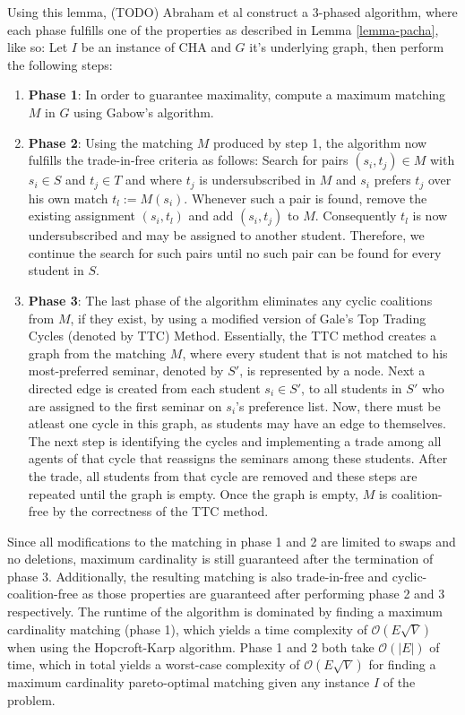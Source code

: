 Using this lemma, (TODO) Abraham et al \cite{Abraham:Pacha} construct a 3-phased algorithm, where each phase fulfills one of the properties as described in Lemma \ref{lemma-pacha}, like so: Let $I$ be an instance of CHA and $G$ it's underlying graph, then perform the following steps:
\begin{enumerate}
    \item \textbf{Phase 1}: In order to guarantee maximality, compute a maximum matching $M$ in $G$ using Gabow's algorithm. \cite{Gabow1983}
    \item \textbf{Phase 2}: Using the matching $M$ produced by step 1, the algorithm now fulfills the trade-in-free criteria as follows: Search for pairs $(s_i, t_j) \in M$ with $s_i \in S$ and $t_j \in T$ and where $t_j$ is undersubscribed in $M$ and $s_i$ prefers $t_j$ over his own match $t_l := M(s_i)$. Whenever such a pair is found, remove the existing assignment $(s_i, t_l)$ and add $(s_i, t_j)$ to $M$. Consequently $t_l$ is now undersubscribed and may be assigned to another student. Therefore, we continue the search for such pairs until no such pair can be found for every student in $S$.
    \item \textbf{Phase 3}: The last phase of the algorithm eliminates any cyclic coalitions from $M$, if they exist, by using a modified version of Gale's Top Trading Cycles (denoted by TTC) Method.\cite{ShapleyTTC} Essentially, the TTC method creates a graph from the matching $M$, where every student that is not matched to his most-preferred seminar, denoted by $S'$, is represented by a node. Next a directed edge is created from each student $s_i \in S'$, to all students in $S'$ who are assigned to the first seminar on $s_i$'s preference list. Now, there must be atleast one cycle in this graph, as students may have an edge to themselves. The next step is identifying the cycles and implementing a trade among all agents of that cycle that reassigns the seminars among these students. After the trade, all students from that cycle are removed and these steps are repeated until the graph is empty. Once the graph is empty, $M$ is coalition-free by the correctness of the TTC method.\cite{Abraham:Pacha}
\end{enumerate}

Since all modifications to the matching in phase 1 and 2 are limited to swaps and no deletions, maximum cardinality is still guaranteed after the termination of phase 3. Additionally, the resulting matching is also trade-in-free and cyclic-coalition-free as those properties are guaranteed after performing phase 2 and 3 respectively. The runtime of the algorithm is dominated by finding a maximum cardinality matching (phase 1), which yields a time complexity of $\mathcal{O}(E\sqrt{V})$\cite{Abraham:Pacha} when using the Hopcroft-Karp algorithm. Phase 1 and 2 both take $\mathcal{O}(|E|)$ of time\cite{SngThesis}, which in total yields a worst-case complexity of $\mathcal{O}(E\sqrt{V})$ for finding a maximum cardinality pareto-optimal matching given any instance $I$ of the problem.

